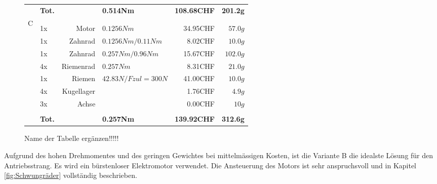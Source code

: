 \begin{figure}[h!]
\begin{tabular}{p{0.5cm}p{0.8cm}rp{3cm}rr}
          & \textbf{Tot.} &       & \textbf{0.514Nm} & \textbf{108.68CHF} & \textbf{201.2g} \\
    \multirow{9}[2]{*}{C} 
          &       &                 &                      &          &  \\
          &       &                 &                      &          &  \\
          & 1x    & Motor           & $0.1256 Nm$          & 34.95CHF & $57.0 g$ \\
          & 1x    & Zahnrad         & $0.1256 Nm / 0.11 Nm$& 8.02CHF  & $10.0 g$ \\
          & 1x    & Zahnrad         & $0.257 Nm / 0.96 Nm$ & 15.67CHF & $102.0 g$ \\
          & 4x    & Riemenrad       & $0.257 Nm$           & 8.31CHF  & $21.0 g$ \\
          & 1x    & Riemen          & $42.83 N / Fzul=300 N$ & 41.00CHF & $10.0 g$ \\
          & 4x    & Kugellager      &                      & 1.76CHF  & $4.9 g$ \\
          & 3x    & Achse           &                      & 0.00CHF  & $10 g$ \\
          &       &                 &                      &          &  \\
          & \textbf{Tot.} &       & \textbf{0.257Nm} & \textbf{139.92CHF} & \textbf{312.6g} \\
    \end{tabular}%
 	\centering
    \caption{Name der Tabelle ergänzen!!!!!}
    \label{tab:addlabel}%
\end{figure}
Aufgrund des hohen Drehmomentes und des geringen Gewichtes bei mittelmässigen Kosten, ist die Variante B die idealste Lösung für den Antriebsstrang. Es wird ein bürstenloser Elektromotor verwendet. Die Ansteuerung des Motors ist sehr anspruchsvoll und in Kapitel \ref{fig:Schwungräder} vollständig beschrieben.
